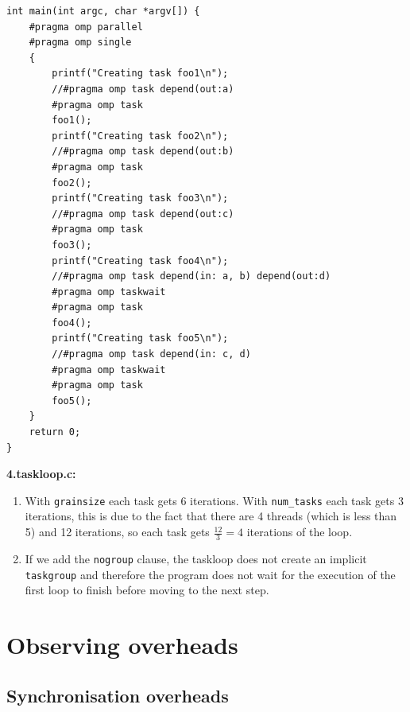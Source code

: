 \begin{enumerate}[label=\textbf{\Alph*)}]
\begin{enumerate}[label=\arabic*.]
        \begin{verbatim}
int main(int argc, char *argv[]) {
    #pragma omp parallel
    #pragma omp single
    {
    	printf("Creating task foo1\n");
    	//#pragma omp task depend(out:a)
        #pragma omp task
    	foo1();
    	printf("Creating task foo2\n");
    	//#pragma omp task depend(out:b)
        #pragma omp task
    	foo2();
    	printf("Creating task foo3\n");
    	//#pragma omp task depend(out:c)
        #pragma omp task
    	foo3();
    	printf("Creating task foo4\n");
    	//#pragma omp task depend(in: a, b) depend(out:d)
        #pragma omp taskwait
        #pragma omp task
    	foo4();
    	printf("Creating task foo5\n");
    	//#pragma omp task depend(in: c, d)
        #pragma omp taskwait
        #pragma omp task
    	foo5();
    }
    return 0;
}
        \end{verbatim}
    \end{enumerate}
    \textbf{4.taskloop.c:}
    \begin{enumerate}[label=\arabic*.]
        \item With \texttt{grainsize} each task gets 6 iterations.
        With \texttt{num\_tasks} each task gets 3 iterations, this is due to the fact that there are 4 threads (which is less
        than 5) and 12 iterations, so each task gets $\frac{12}{3} = 4$ iterations of the loop.
        \item If we add the \texttt{nogroup} clause, the taskloop does not create an implicit \texttt{taskgroup} and therefore the program
        does not wait for the execution of the first loop to finish before moving to the next step.
    \end{enumerate}
\end{enumerate}

\section{Observing overheads}
\label{sec:observing_overheads}

\subsection{Synchronisation overheads}



